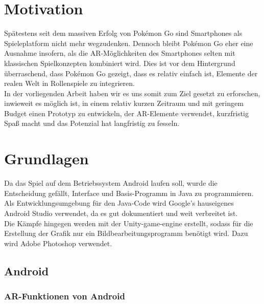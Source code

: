 \documentclass[extern,palatino]{cgBA}
\begin{document}
\section{Motivation}
Spätestens seit dem massiven Erfolg von Pokémon Go sind Smartphones als Spieleplatform nicht mehr wegzudenken. Dennoch bleibt Pokémon Go eher eine Ausnahme insofern, als die AR-Möglichkeiten des Smartphones selten mit klassischen Spielkonzepten kombiniert wird. Dies ist vor dem Hintergrund überraschend, dass Pokémon Go gezeigt, dass es relativ einfach ist, Elemente der realen Welt in Rollenspiele zu integrieren. \\In der vorliegenden Arbeit haben wir es uns somit zum Ziel gesetzt zu erforschen, inwieweit es möglich ist, in einem relativ kurzen Zeitraum und mit geringem Budget einen Prototyp zu entwickeln, der AR-Elemente verwendet, kurzfristig Spaß macht und das Potenzial hat langfristig zu fesseln.
\newpage
\section{Grundlagen}
Da das Spiel auf dem Betriebssystem Android laufen soll, wurde die Entscheidung gefällt, Interface und Basis-Programm in Java zu programmieren. Als Entwicklungsumgebung für den Java-Code wird Google's hauseigenes Android Studio verwendet, da es gut dokumentiert und weit verbreitet ist.
\\Die Kämpfe hingegen werden mit der Unity-game-engine erstellt, sodass für die Erstellung der Grafik nur ein Bildbearbeitungsprogramm benötigt wird. Dazu wird Adobe Photoshop verwendet.
\subsection{Android}
\subsubsection{AR-Funktionen von Android}
\newpage
\end{document}
